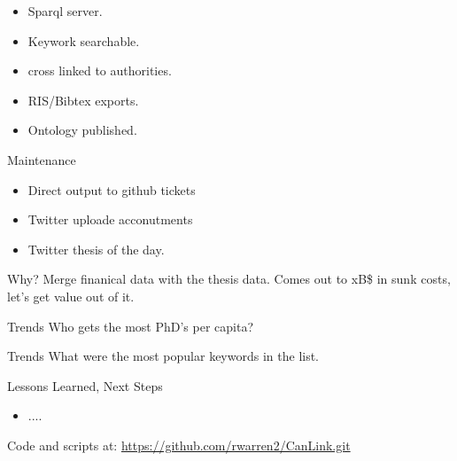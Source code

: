 \documentclass{beamer}
\begin{document}
\begin{frame}
\begin{block}{}
\begin{itemize}
\item Sparql server.
\item Keywork searchable.
\item cross linked to authorities.
\item RIS/Bibtex exports.
\item Ontology published.
\end{itemize}
\end{block}
\end{frame}

\begin{frame}
\begin{block}{Maintenance}
\begin{itemize}
\item Direct output to github tickets
\item Twitter uploade acconutments
\item Twitter thesis of the day.
\end{itemize}
\end{block}
\end{frame}




\begin{frame}
\begin{block}{Why?}
Merge finanical data with the thesis data. Comes out to xB\$ in sunk costs, let's get value out of it.
\end{block}
\end{frame}


\begin{frame}
\begin{block}{Trends}
Who gets the most PhD's per capita?
\end{block}
\end{frame}

\begin{frame}
\begin{block}{Trends}
What were the most popular keywords in the list.
\end{block}
\end{frame}


\begin{frame}
\begin{block}{Lessons Learned, Next Steps}
\begin{itemize}
\item ....
\end{itemize}
\end{block}
\begin{alertblock}{}
Code and scripts at: \url{https://github.com/rwarren2/CanLink.git}
\end{alertblock}
\end{frame}

\end{document}
